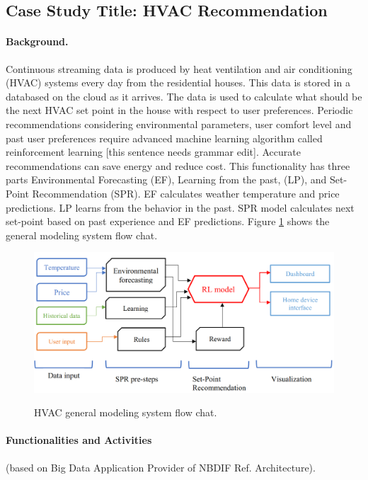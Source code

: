 \subsection{Case Study Title: HVAC Recommendation}


\paragraph*{Background.}

Continuous streaming data is produced by heat ventilation and air conditioning (HVAC) systems every
day from the residential houses. This data is stored in a databased on the cloud as it arrives. The data
is used to calculate what should be the next HVAC set point in the house with respect to user
preferences. Periodic recommendations considering environmental parameters, user comfort level
and past user preferences require advanced machine learning algorithm called reinforcement
learning [this sentence needs grammar edit]. Accurate recommendations can save energy and reduce cost. This functionality has three
parts Environmental Forecasting (EF), Learning from the past, (LP), and Set-Point Recommendation
(SPR). EF calculates weather temperature and price predictions. LP learns from the behavior in the
past. SPR model calculates next set-point based on past experience and EF predictions. Figure \ref{fig:hvac-1} shows
the general modeling system flow chat.

\begin{figure}[htb]
\includegraphics[width=1.0\textwidth]{usecase/hvac.png}
\label{fig:hvac-1}
\caption{HVAC general modeling system flow chat.}
\end{figure}



\paragraph*{Functionalities and Activities} (based on Big Data Application Provider of NBDIF Ref. Architecture).


